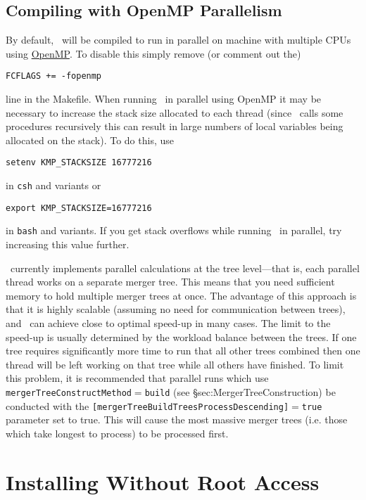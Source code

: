 \subsection{Compiling with OpenMP Parallelism}

By default, \glc\ will be compiled to run in parallel on machine with multiple CPUs using \href{http://openmp.org/wp/}{OpenMP}. To disable this simply remove (or comment out the)
\begin{verbatim}
FCFLAGS += -fopenmp
\end{verbatim}
line in the Makefile. When running \glc\ in parallel using OpenMP it may be necessary to increase the stack size allocated to each thread (since \glc\ calls some procedures recursively this can result in large numbers of local variables being allocated on the stack). To do this, use
\begin{verbatim}
setenv KMP_STACKSIZE 16777216
\end{verbatim}
in {\tt csh} and variants or
\begin{verbatim}
export KMP_STACKSIZE=16777216
\end{verbatim}
in {\tt bash} and variants. If you get stack overflows while running \glc\ in parallel, try increasing this value further.

\glc\ currently implements parallel calculations at the tree level---that is, each parallel thread works on a separate merger tree. This means that you need sufficient memory to hold multiple merger trees at once. The advantage of this approach is that it is highly scalable (assuming no need for communication between trees), and \glc\ can achieve close to optimal speed-up in many cases. The limit to the speed-up is usually determined by the workload balance between the trees. If one tree requires significantly more time to run that all other trees combined then one thread will be left working on that tree while all others have finished. To limit this problem, it is recommended that parallel runs which use {\tt mergerTreeConstructMethod}$=${\tt build} (see \S{sec:MergerTreeConstruction}) be conducted with the {\tt [mergerTreeBuildTreesProcessDescending]}$=${\tt true} parameter set to true. This will cause the most massive merger trees (i.e. those which take longest to process) to be processed first.

\section{Installing Without Root Access}

